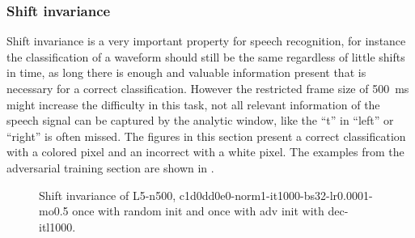 \subsubsection{Shift invariance}
Shift invariance is a very important property for speech recognition, for instance the classification of a waveform should still be the same regardless of little shifts in time, as long there is enough and valuable information present that is necessary for a correct classification.
However the restricted frame size of \SI{500}{\milli\second} might increase the difficulty in this task, not all relevant information of the speech signal can be captured by the analytic window, like the \enquote{t} in \enquote{left} or \enquote{right} is often missed.
The figures in this section present a correct classification with a colored pixel and an incorrect with a white pixel.
The examples from the adversarial training section are shown in .
\begin{figure}[!ht]
  \centering
  \caption{Shift invariance of L5-n500, c1d0dd0e0-norm1-it1000-bs32-lr0.0001-mo0.5 once with random init and once with adv init with dec-itl1000.}
  \label{fig:exp_tb_shift_fc3}
\end{figure}
\FloatBarrier
\noindent



